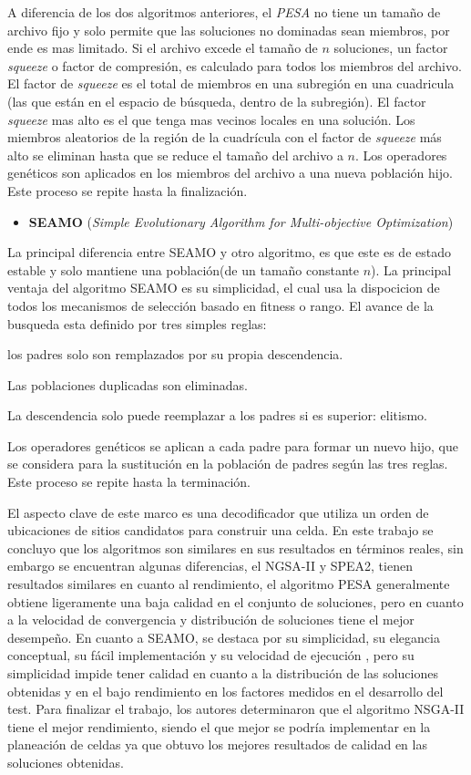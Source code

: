 \documentclass[]{article}
\providecommand{\tightlist}{%
  \setlength{\itemsep}{0pt}\setlength{\parskip}{0pt}}
\begin{document}
A diferencia de los dos algoritmos anteriores, el \emph{PESA} no tiene
un tamaño de archivo fijo y solo permite que las soluciones no dominadas
sean miembros, por ende es mas limitado. Si el archivo excede el tamaño
de \(n\) soluciones, un factor \emph{squeeze} o factor de compresión, es
calculado para todos los miembros del archivo. El factor de
\emph{squeeze} es el total de miembros en una subregión en una
cuadricula (las que están en el espacio de búsqueda, dentro de la
subregión). El factor \emph{squeeze} mas alto es el que tenga mas
vecinos locales en una solución. Los miembros aleatorios de la región de
la cuadrícula con el factor de \emph{squeeze} más alto se eliminan hasta
que se reduce el tamaño del archivo a \(n\). Los operadores genéticos
son aplicados en los miembros del archivo a una nueva población hijo.
Este proceso se repite hasta la finalización.

\begin{itemize}
\tightlist
\item
  \textbf{SEAMO} (\emph{Simple Evolutionary Algorithm for
  Multi-objective Optimization})
\end{itemize}

La principal diferencia entre SEAMO y otro algoritmo, es que este es de
estado estable y solo mantiene una población(de un tamaño constante
\(n\)). La principal ventaja del algoritmo SEAMO es su simplicidad, el
cual usa la dispocicion de todos los mecanismos de selección basado en
fitness o rango. El avance de la busqueda esta definido por tres simples
reglas:

los padres solo son remplazados por su propia descendencia.

Las poblaciones duplicadas son eliminadas.

La descendencia solo puede reemplazar a los padres si es superior:
elitismo.

Los operadores genéticos se aplican a cada padre para formar un nuevo
hijo, que se considera para la sustitución en la población de padres
según las tres reglas. Este proceso se repite hasta la terminación.

El aspecto clave de este marco es una decodificador que utiliza un orden
de ubicaciones de sitios candidatos para construir una celda. En este
trabajo se concluyo que los algoritmos son similares en sus resultados
en términos reales, sin embargo se encuentran algunas diferencias, el
NGSA-II y SPEA2, tienen resultados similares en cuanto al rendimiento,
el algoritmo PESA generalmente obtiene ligeramente una baja calidad en
el conjunto de soluciones, pero en cuanto a la velocidad de convergencia
y distribución de soluciones tiene el mejor desempeño. En cuanto a
SEAMO, se destaca por su simplicidad, su elegancia conceptual, su fácil
implementación y su velocidad de ejecución , pero su simplicidad impide
tener calidad en cuanto a la distribución de las soluciones obtenidas y
en el bajo rendimiento en los factores medidos en el desarrollo del
test. Para finalizar el trabajo, los autores determinaron que el
algoritmo NSGA-II tiene el mejor rendimiento, siendo el que mejor se
podría implementar en la planeación de celdas ya que obtuvo los mejores
resultados de calidad en las soluciones obtenidas.
\end{document}
